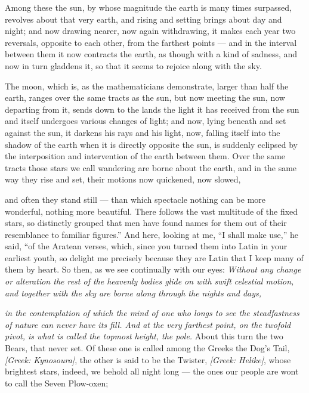  Among these the sun, by whose magnitude the earth is many times surpassed, revolves about that very earth, and rising and setting brings about day and night; and now drawing nearer, now again withdrawing, it makes each year two reversals, opposite to each other, from the farthest points — and in the interval between them it now contracts the earth, as though with a kind of sadness, and now in turn gladdens it, so that it seems to rejoice along with the sky.

 The moon, which is, as the mathematicians demonstrate, larger than half the earth, ranges over the same tracts as the sun, but now meeting the sun, now departing from it, sends down to the lands the light it has received from the sun and itself undergoes various changes of light; and now, lying beneath and set against the sun, it darkens his rays and his light, now, falling itself into the shadow of the earth when it is directly opposite the sun, is suddenly eclipsed by the interposition and intervention of the earth between them. Over the same tracts those stars we call wandering are borne about the earth, and in the same way they rise and set, their motions now quickened, now slowed,

 and often they stand still — than which spectacle nothing can be more wonderful, nothing more beautiful. There follows the vast multitude of the fixed stars, so distinctly grouped that men have found names for them out of their resemblance to familiar figures.'' And here, looking at me, ``I shall make use,'' he said, ``of the Aratean verses, which, since you turned them into Latin in your earliest youth, so delight me precisely because they are Latin that I keep many of them by heart. So then, as we see continually with our eyes: \textit{Without any change or alteration the rest of the heavenly bodies glide on with swift celestial motion, and together with the sky are borne along through the nights and days,}

 \textit{in the contemplation of which the mind of one who longs to see the steadfastness of nature can never have its fill. And at the very farthest point, on the twofold pivot, is what is called the topmost height, the pole.} About this turn the two Bears, that never set. Of these one is called among the Greeks the Dog's Tail, \textit{[Greek: Kynosoura]}, the other is said to be the Twister, \textit{[Greek: Helike]}, whose brightest stars, indeed, we behold all night long — the ones our people are wont to call the Seven Plow-oxen;

